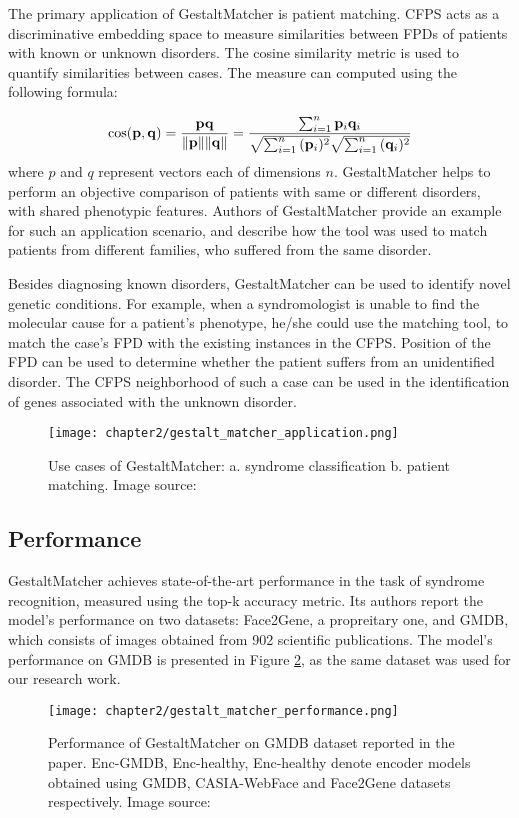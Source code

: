 \documentclass[../report.tex]{subfiles}
\begin{document}
    
    The primary application of GestaltMatcher is patient matching. CFPS acts as a discriminative embedding space to measure similarities between FPDs of patients with known or unknown disorders. The cosine similarity metric is used to quantify similarities between cases. The measure can computed using the following formula: 
 
    \begin{equation}
    	\cos ({\bf p},{\bf q})= {{\bf p} {\bf q} \over \|{\bf p}\| \|{\bf q}\|} = \frac{ \sum_{i=1}^{n}{{\bf p}_i{\bf q}_i} }{ \sqrt{\sum_{i=1}^{n}{({\bf p}_i)^2}} \sqrt{\sum_{i=1}^{n}{({\bf q}_i)^2}} }
    \end{equation}
	where $p$ and $q$ represent vectors each of dimensions $n$.
    GestaltMatcher helps to perform an objective comparison of patients with same or different disorders, with shared phenotypic features. Authors of GestaltMatcher provide an example for such an application scenario, and describe how the tool was used to match patients from different families, who suffered from the same disorder. 
    
    Besides diagnosing known disorders, GestaltMatcher can be used to identify novel genetic conditions. For example, when a syndromologist is unable to find the molecular cause for a patient's phenotype, he/she could use the matching tool, to match the case's FPD with the existing instances in the CFPS. Position of the FPD can be used to determine whether the patient suffers from an unidentified disorder. The CFPS neighborhood of such a case can be used in the identification of genes associated with the unknown disorder. 
    \begin{figure}[ht]
    	\hspace*{1.0cm}      
    	\texttt{[image: chapter2/gestalt\_matcher\_application.png]}
    	\caption{Use cases of GestaltMatcher: a. syndrome classification b. patient matching. Image source: \cite{hsieh2022gestaltmatcher}}
    	\label{fig_app_gest_matcher_chap2}
    \end{figure}
    \subsection{Performance}
    GestaltMatcher achieves state-of-the-art performance in the task of syndrome recognition, measured using the top-k accuracy metric. Its authors report the model's performance on two datasets: Face2Gene, a propreitary one, and GMDB, which consists of images obtained from 902 scientific publications. The model's performance on GMDB is presented in Figure \ref{fig_gm_perf}, as the same dataset was used for our research work.
    \begin{figure}[ht]
    	\centering
    	\texttt{[image: chapter2/gestalt\_matcher\_performance.png]}
    	\caption[Performance of GestaltMatcher on GMDB dataset reported in the paper]{Performance of GestaltMatcher on GMDB dataset reported in the paper. Enc-GMDB, Enc-healthy, Enc-healthy denote encoder models obtained using GMDB, CASIA-WebFace and Face2Gene datasets respectively. Image source: \cite{hsieh2022gestaltmatcher}}
    	\label{fig_gm_perf}
    \end{figure}  
\end{document}

